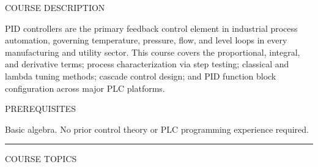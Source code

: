 \documentclass[10pt]{article}
\begin{document}

\vspace{0.70in}

{\small\sffamily\color{pgray}\MakeUppercase{Course Description}}
\smallskip

{\small PID controllers are the primary feedback control element in industrial process automation, governing temperature, pressure, flow, and level loops in every manufacturing and utility sector. This course covers the proportional, integral, and derivative terms; process characterization via step testing; classical and lambda tuning methods; cascade control design; and PID function block configuration across major PLC platforms.}

\smallskip
{\small\sffamily\color{pgray}\MakeUppercase{Prerequisites}}
\smallskip

{\small Basic algebra. No prior control theory or PLC programming experience required.}

\smallskip
{\color{pnavy}\rule{\linewidth}{1.2pt}}
\smallskip
{\small\sffamily\color{pgray}\MakeUppercase{Course Topics}}
\smallskip
\end{document}
